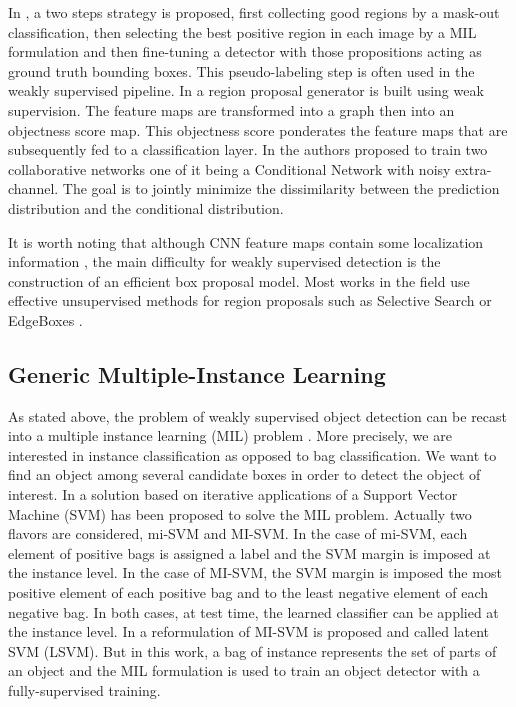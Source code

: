 \documentclass[preprint]{elsarticle}
\begin{document}
 
In \cite{li_weakly_2016}, a two steps strategy is proposed, first collecting good regions by a mask-out classification, then selecting the best positive region in each image by a MIL formulation and then fine-tuning a detector with those propositions acting as ground truth bounding boxes. This pseudo-labeling step is often used in the weakly supervised pipeline. In \cite{zhu_soft_2017} a region proposal generator is built using weak supervision. The feature maps are transformed into a graph then into an objectness score map. This objectness score ponderates the feature maps that are subsequently fed to a classification layer. In \cite{arun_dissimilarity_2019} the authors proposed to train two collaborative networks one of it being a Conditional Network with noisy extra-channel. The goal is to jointly minimize the dissimilarity between the prediction distribution and the conditional distribution.


It is worth noting that although CNN feature maps contain some localization information \cite{oquab_is_2015}, the main difficulty for weakly supervised detection is the construction of an efficient box proposal model. Most works in the field use effective unsupervised methods for region proposals such as Selective Search \cite{uijlings_selective_2013} or EdgeBoxes \cite{zitnick_edge_2014}.






\subsection{Generic Multiple-Instance Learning}
\label{sec:GenericMIL}

 As stated above, the problem of weakly supervised object detection can be recast into a multiple instance learning (MIL)  problem \cite{dietterich_solving_1997}. More precisely, we are interested in instance classification as opposed to bag classification. We want to find an object among several candidate boxes in order to detect the object of interest. In \cite{andrews_support_2003}  a solution based on iterative applications of a Support Vector Machine (SVM) has been proposed to solve the MIL problem. Actually two flavors are considered, mi-SVM and MI-SVM. In the case of mi-SVM, each element of positive bags is assigned a label and the SVM margin is imposed at the instance level. In the case of MI-SVM, the SVM margin is imposed the most positive element of each positive bag and to the least negative element of each negative bag. In both cases, at test time, the learned classifier can be applied at the instance level. In \cite{felzenszwalb_object_2010} a reformulation of MI-SVM is proposed and called latent SVM (LSVM). But in this work, a bag of instance represents the set of parts of an object and the MIL formulation is used to train an object detector with a fully-supervised training. 
 
\end{document}
